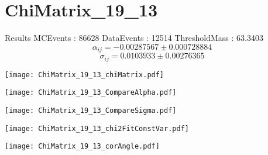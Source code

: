 \documentclass[a4paper,12pt]{article}
\begin{document}
\section{ChiMatrix\_19\_13}
\begin{minipage}{0.49\linewidth} Results \newline
MCEvents : 86628\newline
DataEvents : 12514 \newline
ThresholdMass : 63.3403\\
$$\alpha_{ij} = -0.00287567\pm 0.000728884$$
$$\sigma_{ij} = 0.0103933\pm 0.00276365$$
\end{minipage}\hfill
\begin{minipage}{0.49\linewidth} 
\texttt{[image: ChiMatrix\_19\_13\_chiMatrix.pdf]}\\
\end{minipage}
\hfill
\begin{minipage}{0.49\linewidth} 
\texttt{[image: ChiMatrix\_19\_13\_CompareAlpha.pdf]}\\
\end{minipage}
\hfill
\begin{minipage}{0.49\linewidth} 
\texttt{[image: ChiMatrix\_19\_13\_CompareSigma.pdf]}\\
\end{minipage}
\begin{minipage}{0.49\linewidth} 
\texttt{[image: ChiMatrix\_19\_13\_chi2FitConstVar.pdf]}\\
\end{minipage}
\hfill
\begin{minipage}{0.49\linewidth} 
\texttt{[image: ChiMatrix\_19\_13\_corAngle.pdf]}\\
\end{minipage}
\end{document}
